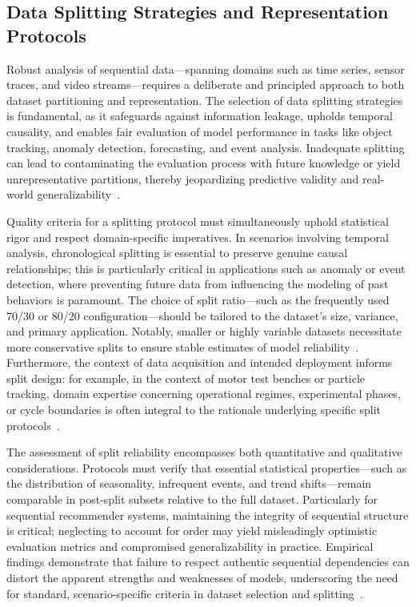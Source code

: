 \documentclass[sigconf]{acmart}
\begin{document}
\subsection{Data Splitting Strategies and Representation Protocols}

Robust analysis of sequential data—spanning domains such as time series, sensor traces, and video streams—requires a deliberate and principled approach to both dataset partitioning and representation. The selection of data splitting strategies is fundamental, as it safeguards against information leakage, upholds temporal causality, and enables fair evaluation of model performance in tasks like object tracking, anomaly detection, forecasting, and event analysis. Inadequate splitting can lead to contaminating the evaluation process with future knowledge or yield unrepresentative partitions, thereby jeopardizing predictive validity and real-world generalizability~\cite{ref87}.

Quality criteria for a splitting protocol must simultaneously uphold statistical rigor and respect domain-specific imperatives. In scenarios involving temporal analysis, chronological splitting is essential to preserve genuine causal relationships; this is particularly critical in applications such as anomaly or event detection, where preventing future data from influencing the modeling of past behaviors is paramount. The choice of split ratio—such as the frequently used 70/30 or 80/20 configuration—should be tailored to the dataset's size, variance, and primary application. Notably, smaller or highly variable datasets necessitate more conservative splits to ensure stable estimates of model reliability~\cite{ref87}. Furthermore, the context of data acquisition and intended deployment informs split design: for example, in the context of motor test benches or particle tracking, domain expertise concerning operational regimes, experimental phases, or cycle boundaries is often integral to the rationale underlying specific split protocols~\cite{ref87}.

The assessment of split reliability encompasses both quantitative and qualitative considerations. Protocols must verify that essential statistical properties—such as the distribution of seasonality, infrequent events, and trend shifts—remain comparable in post-split subsets relative to the full dataset. Particularly for sequential recommender systems, maintaining the integrity of sequential structure is critical; neglecting to account for order may yield misleadingly optimistic evaluation metrics and compromised generalizability in practice. Empirical findings demonstrate that failure to respect authentic sequential dependencies can distort the apparent strengths and weaknesses of models, underscoring the need for standard, scenario-specific criteria in dataset selection and splitting~\cite{ref87}.
\end{document}
